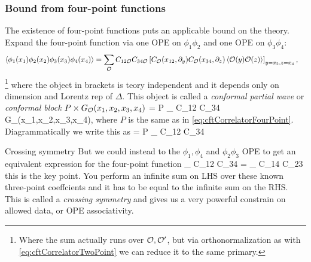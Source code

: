  	\subsubsection{Bound from four-point functions}
 	The existence of four-point functions puts an applicable bound on the theory.  Expand the four-point function via one OPE on $\phi_1 \phi_2$ and one OPE on $\phi_3 \phi_4$:
 	\begin{align*}
 	 \expval{\phi_1 (x_1) \phi_2(x_2) \phi_3(x_3) \phi_4(x_4)} &= \sum_{\mathcal{O}} C_{12 \mathcal{O}} C_{34\mathcal{O}} \left[ C_{\mathcal{O}}(x_{12},\partial_y) C_{\mathcal{O}}(x_{34},\partial_z) \expval{\mathcal{O}(y) \mathcal{O}(z)} \right]_{y=x_2, z=x_4},
 	\end{align*}\footnote{Where the sum actually runs over $\mathcal{O}, \mathcal{O}^\prime$, but via orthonormalization as with \ref{eq:cftCorrelatorTwoPoint} we can reduce it to the same primary.}
 	where the object in brackets is teory independent and it depends only on dimension and Lorentz rep of $\Delta$. This object is called a  \emph{conformal partial wave} or \emph{conformal block} $P\times G_{\mathcal{O}} (x_1 ,x_2 , x_3,x_4)$
 	\be 
 	\label{eq:cftConformalBlock}
 	 = P \sum_{\mO} C_{12\mO} C_{34\mO} G_{\mO}(x_1,x_2,x_3,x_4),
 	\ee 
 	where $P$ is the same as in \ref{eq:cftCorrelatorFourPoint}. Diagrammatically we write this as 
 	 	\bse 
  	 = P \sum_{\mO} C_{12\mO} C_{34\mO} %
 	\ese
 	\begin{mybox}{Crossing symmetry}
 	But we could instead to the $\phi_1, \phi_4$ and $\phi_2 \phi_3$ OPE to get an equivalent expression for the four-point function 
 	\be 
 	\label{eq:cftCrossingSymmetry}
	\sum_{\mO} C_{12\mO} C_{34\mO}%
 	= \sum_{\mO} C_{14\mO} C_{23\mO} %
 	\ee 
 	this is the key point. You perform an infinite sum on LHS over these known three-point coeffcients and it has to be equal to the infinite sum on the RHS. This is called a \emph{crossing symmetry} and gives us a very powerful constrain on allowed data, or OPE associativity.
 	\end{mybox} 
 	
